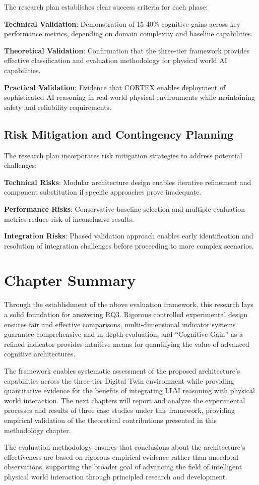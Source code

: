 The research plan establishes clear success criteria for each phase:

\textbf{Technical Validation}: Demonstration of 15-40\% cognitive gains across key performance metrics, depending on domain complexity and baseline capabilities.

\textbf{Theoretical Validation}: Confirmation that the three-tier framework provides effective classification and evaluation methodology for physical world AI capabilities.

\textbf{Practical Validation}: Evidence that CORTEX enables deployment of sophisticated AI reasoning in real-world physical environments while maintaining safety and reliability requirements.

\subsection{Risk Mitigation and Contingency Planning}

The research plan incorporates risk mitigation strategies to address potential challenges:

\textbf{Technical Risks}: Modular architecture design enables iterative refinement and component substitution if specific approaches prove inadequate.

\textbf{Performance Risks}: Conservative baseline selection and multiple evaluation metrics reduce risk of inconclusive results.

\textbf{Integration Risks}: Phased validation approach enables early identification and resolution of integration challenges before proceeding to more complex scenarios.

\section{Chapter Summary}

Through the establishment of the above evaluation framework, this research lays a solid foundation for answering RQ3. Rigorous controlled experimental design ensures fair and effective comparisons, multi-dimensional indicator systems guarantee comprehensive and in-depth evaluation, and ``Cognitive Gain'' as a refined indicator provides intuitive means for quantifying the value of advanced cognitive architectures.

The framework enables systematic assessment of the proposed architecture's capabilities across the three-tier Digital Twin environment while providing quantitative evidence for the benefits of integrating LLM reasoning with physical world interaction. The next chapters will report and analyze the experimental processes and results of three case studies under this framework, providing empirical validation of the theoretical contributions presented in this methodology chapter.

The evaluation methodology ensures that conclusions about the architecture's effectiveness are based on rigorous empirical evidence rather than anecdotal observations, supporting the broader goal of advancing the field of intelligent physical world interaction through principled research and development.